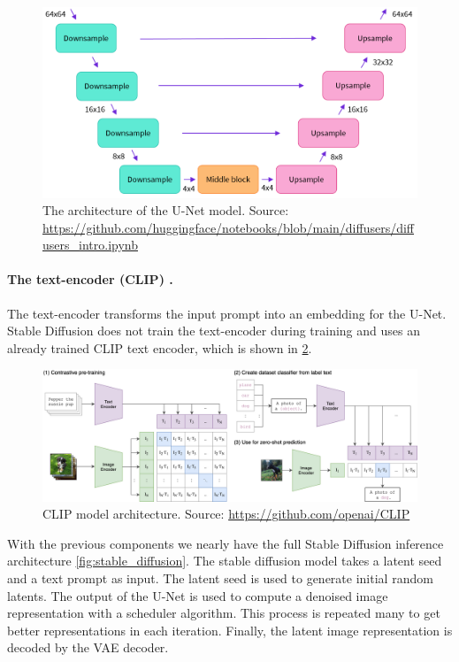 \begin{figure}[ht]
    \centering
    \includegraphics[width=\linewidth]{images/unet-model.png}
    \caption{The architecture of the U-Net model. Source: \url{https://github.com/huggingface/notebooks/blob/main/diffusers/diffusers_intro.ipynb}}
    \label{fig:unet_model}
\end{figure}

\paragraph{The text-encoder (CLIP) \cite{radford2021clip}.} The text-encoder transforms the input prompt into an embedding for the U-Net. Stable Diffusion does not train the text-encoder during training and uses an already trained CLIP text encoder, which is shown in \cref{fig:clip}.

\begin{figure}[ht]
    \centering
    \includegraphics[width=\linewidth]{images/clip.png}
    \caption{CLIP model architecture. Source: \url{https://github.com/openai/CLIP}}
    \label{fig:clip}
\end{figure}

With the previous components we nearly have the full Stable Diffusion inference architecture \cref{fig:stable_diffusion}. The stable diffusion model takes a latent seed and a text prompt as input. The latent seed is  used to generate initial random latents. The output of the U-Net is used to compute a denoised image representation with a scheduler algorithm. This process is repeated many to get better representations in each iteration. Finally, the latent image representation is decoded by the VAE decoder.

